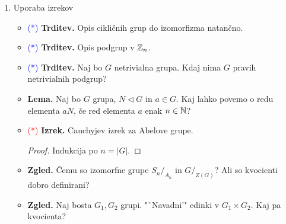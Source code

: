 \begin{enumerate}
\begin{itemize}
\begin{proof}
            Ideja: 1.\ izrek o izomorfizmu.
        \end{proof}
        \item \textcolor{blue}{(*)} \textbf{Izrek.} 3.\ izrek o izomorfizmu.
        \begin{proof}
            Ideja: 1.\ izrek o izomorfizmu.
        \end{proof}
        \item \textbf{Lema.} Naj bo \(\varphi: G \to H\) homomorfizem grup, \(K \subseteq G, \ L \subseteq H\).
        \begin{itemize}
            \item Zadosten pogoj, da je \(\img{\varphi}(K) \leq H\);
            \item Zadosten pogoj, da je \(\img{\varphi}(K) \triangleleft H\);
            \item Zadosten pogoj, da je \(\invimg{\varphi}(L) \leq G\);
            \item Zadosten pogoj, da je \(\invimg{\varphi}(L) \triangleleft G\).
        \end{itemize}
        \item \textcolor{blue}{(*)} \textbf{Izrek.} Korespondenčni izrek.
    \end{itemize}

    \item Uporaba izrekov
    \begin{itemize}
        \item \textcolor{blue}{(*)} \textbf{Trditev.} Opis cikličnih grup do izomorfizma natančno.
        \item \textcolor{blue}{(*)} \textbf{Trditev.} Opis podgrup v \(\mathbb{Z}_n\).
        \item \textcolor{blue}{(*)} \textbf{Trditev.} Naj bo \(G\) netrivialna grupa. Kdaj nima \(G\) pravih netrivialnih podgrup?
        \item \textbf{Lema.} Naj bo \(G\) grupa, \(N \triangleleft G\) in \(a \in G\). Kaj lahko povemo o redu elementa \(aN\), če red elementa \(a\) enak \(n \in \mathbb{N}\)?
        \item \textcolor{red}{(*)} \textbf{Izrek.} Cauchyjev izrek za Abelove grupe.
        \begin{proof}
            Indukcija po \(n = |G|\).
        \end{proof}
        \item \textbf{Zgled.} Čemu so izomorfne grupe \(S_n/_{A_n}\) in \(G/_{Z(G)}\)? Ali so kvocienti dobro definirani?
        \item \textbf{Zgled.} Naj bosta \(G_1, G_2\) grupi. "`Navadni'" edinki v \(G_1 \times G_2\). Kaj pa kvocienta?
    \end{itemize}


\end{enumerate}

